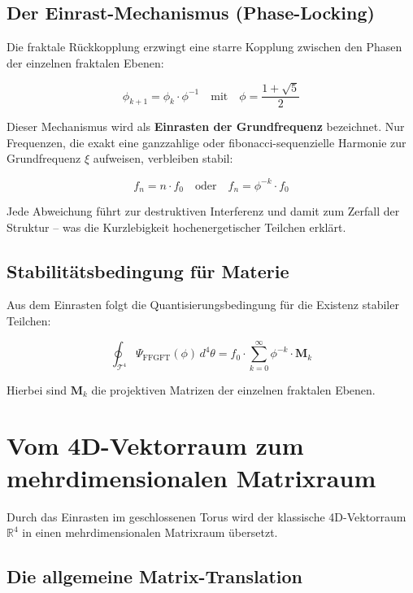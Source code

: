 	\subsection{Der Einrast-Mechanismus (Phase-Locking)}
	
	Die fraktale Rückkopplung erzwingt eine starre Kopplung zwischen den Phasen der einzelnen fraktalen Ebenen:
	
	\begin{equation}
		\phi_{k+1} = \phi_k \cdot \phi^{-1} \quad \text{mit} \quad \phi = \frac{1+\sqrt{5}}{2}
	\end{equation}
	
	Dieser Mechanismus wird als \textbf{Einrasten der Grundfrequenz} bezeichnet. Nur Frequenzen, die exakt eine ganzzahlige oder fibonacci-sequenzielle Harmonie zur Grundfrequenz $\xi$ aufweisen, verbleiben stabil:
	
	\begin{equation}
		f_n = n \cdot f_0 \quad \text{oder} \quad f_n = \phi^{-k} \cdot f_0
	\end{equation}
	
	Jede Abweichung führt zur destruktiven Interferenz und damit zum Zerfall der Struktur – was die Kurzlebigkeit hochenergetischer Teilchen erklärt.
	
	\subsection{Stabilitätsbedingung für Materie}
	
	Aus dem Einrasten folgt die Quantisierungsbedingung für die Existenz stabiler Teilchen:
	
	\begin{equation}
		\oint_{\mathcal{T}^4} \Psi_{\text{FFGFT}}(\phi) \, d^4\theta = f_0 \cdot \sum_{k=0}^{\infty} \phi^{-k} \cdot \mathbf{M}_k
	\end{equation}
	
	Hierbei sind $\mathbf{M}_k$ die projektiven Matrizen der einzelnen fraktalen Ebenen.
	
	\section{Vom 4D-Vektorraum zum mehrdimensionalen Matrixraum}
	
	Durch das Einrasten im geschlossenen Torus wird der klassische 4D-Vektorraum $\mathbb{R}^4$ in einen mehrdimensionalen Matrixraum übersetzt.
	
	\subsection{Die allgemeine Matrix-Translation}
	
